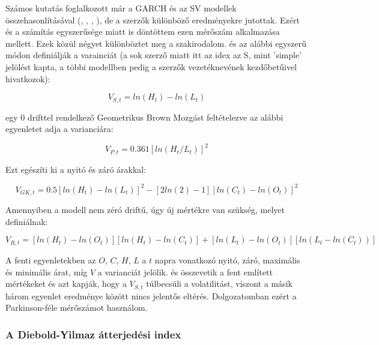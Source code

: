 \documentclass[12pt,bibliography=totoc]{article}
\begin{document}
Számos kutatás foglalkozott már a GARCH és az SV modellek összehasonlításával (\cite{kat1994volatility}, \cite{andersen1994stochastic}, \cite{kim1998stochastic}, \cite{chan2003using}), de a szerzők különböző eredményekre jutottak. Ezért és a számítás egyszerűsége miatt is döntöttem ezen mérőszám alkalmazása mellett. Ezek közül négyet különböztet meg a szakirodalom. \cite{alizadeh2002range} és \cite{gallant1999using} az alábbi egyszerű módon definiálják a varainciát (a sok szerző miatt itt az idex az S, mint 'simple' jelölést kapta, a többi modellben pedig a szerzők vezetéknevének kezdőbetűivel hivatkozok):

\begin{equation}
V_{S,t}=ln(H_t) - ln(L_t)
\end{equation}

\cite{parkinson1980extreme} egy 0 drifttel rendelkező Geometrikus Brown Mozgást feltételezve az alábbi egyenletet adja a varianciára:

\begin{equation}
V_{P,t}=0.361[ln(H_t/L_t)]^2
\end{equation}

Ezt egészíti ki \cite{garman1980estimation} a nyitó és záró árakkal:

\begin{equation}
V_{GK,t}=0.5[ln(H_t)-ln(L_t)]^2-[2ln(2)-1][ln(C_t)-ln(O_t)]^2
\end{equation}

Amennyiben a modell nem zéró driftű, úgy új mértékre van szükség, melyet \cite{rogers1994estimating} definiálnak:

\begin{equation}
V_{R,t}=[ln(H_t)-ln(O_t)][ln(H_t)-ln(C_t)]+[ln(L_t)-ln(O_t)][ln(L_t-ln(C_t))]
\end{equation}

A fenti egyenletekben az $O$, $C$, $H$, $L$ a $t$ napra vonatkozó nyitó, záró, maximális és minimális árat, míg $V$ a varianciát jelölik. \cite{chan2003using} és \cite{floros2009modelling} összevetik a fent említett mértékeket és azt kapják, hogy a $V_{S,t}$ túlbecsüli a volatilitást, viszont a másik három egyenlet eredménye között nincs jelentős eltérés. Dolgozatomban ezért a Parkinson-féle mérőszámot használom.


\subsubsection{A Diebold-Yilmaz átterjedési index}
\end{document}
